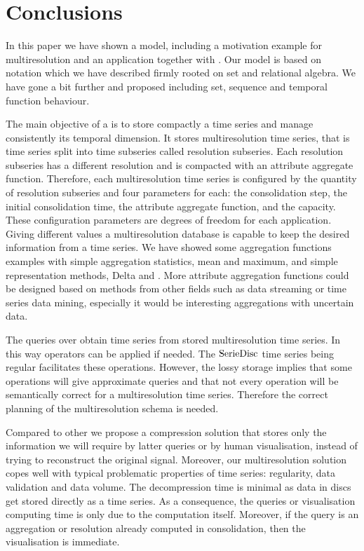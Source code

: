 


\section{Conclusions}
\label{sec:concl-future-work}


In this paper we have shown a  model, including a
motivation example for multiresolution and an application together
with . Our  model is based on 
notation which we have described firmly rooted on set and relational
algebra. We have gone a bit further and proposed  including
set, sequence and temporal function behaviour.



The main objective of a  is to store compactly a time
series and manage consistently its temporal dimension.  It stores
multiresolution time series, that is time series split into time
subseries called resolution subseries.  Each resolution subseries has
a different resolution and is compacted with an attribute aggregate
function. Therefore, each multiresolution time series is configured by
the quantity of resolution subseries and four parameters for each: the
consolidation step, the initial consolidation time, the attribute
aggregate function, and the capacity.  These configuration parameters
are degrees of freedom for each application. Giving different values a
multiresolution database is capable to keep the desired information
from a time series. %
We have showed some aggregation functions examples with simple
aggregation statistics, mean and maximum, and simple representation
methods, Delta and \zohe{}. More attribute aggregation functions could
be designed based on methods from other fields such as data streaming
or time series data mining, especially it would be interesting aggregations with uncertain data.


The queries over  obtain time series from stored
multiresolution time series. In this way  operators can be
applied if needed. The $\operatorname{SerieDisc}$ time series being regular
facilitates these operations. However, the lossy storage implies that
some operations will give approximate queries and that not every
 operation will be semantically correct for a
multiresolution time series. Therefore the correct planning of the
multiresolution schema is needed.


Compared to other  we propose a compression solution that
stores only the information we will require by latter queries or by
human visualisation, instead of trying to reconstruct the original
signal.  Moreover, our multiresolution solution copes well with
typical problematic properties of time series: regularity, data
validation and data volume.  The decompression time is minimal as data
in discs get stored directly as a time series. As a consequence, the
queries or visualisation computing time is only due to the computation
itself. Moreover, if the query is an aggregation or resolution already
computed in  consolidation, then the visualisation is
immediate.


